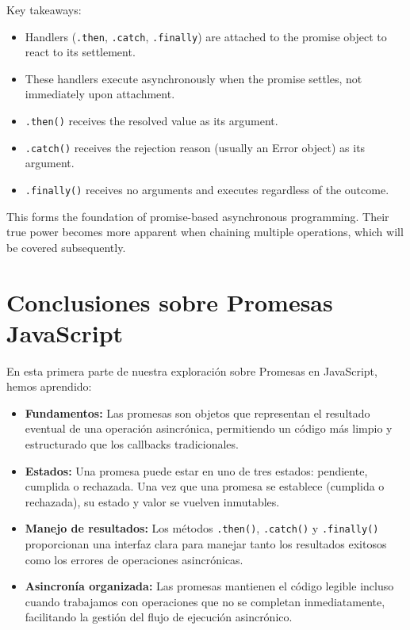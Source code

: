 \documentclass[12pt,letterpaper]{article}
\begin{document}
Key takeaways:
\begin{itemize}
    \item Handlers (\texttt{\textcolor{accentColor}{.then}}, \texttt{\textcolor{accentColor}{.catch}}, \texttt{\textcolor{accentColor}{.finally}}) are attached to the promise object to react to its settlement.
    \item These handlers execute asynchronously when the promise settles, not immediately upon attachment.
    \item \texttt{\textcolor{accentColor}{.then()}} receives the resolved value as its argument.
    \item \texttt{\textcolor{accentColor}{.catch()}} receives the rejection reason (usually an Error object) as its argument.
    \item \texttt{\textcolor{accentColor}{.finally()}} receives no arguments and executes regardless of the outcome.
\end{itemize}

This forms the foundation of promise-based asynchronous programming. Their true power becomes more apparent when chaining multiple operations, which will be covered subsequently.

\section{Conclusiones sobre Promesas JavaScript}

En esta primera parte de nuestra exploración sobre Promesas en JavaScript, hemos aprendido:

\begin{itemize}
    \item \textbf{\textcolor{accentColor}{Fundamentos:}} Las promesas son objetos que representan el resultado eventual de una operación asincrónica, permitiendo un código más limpio y estructurado que los callbacks tradicionales.
    
    \item \textbf{\textcolor{accentColor}{Estados:}} Una promesa puede estar en uno de tres estados: pendiente, cumplida o rechazada. Una vez que una promesa se establece (cumplida o rechazada), su estado y valor se vuelven inmutables.
    
    \item \textbf{\textcolor{accentColor}{Manejo de resultados:}} Los métodos \texttt{\textcolor{accentColor}{.then()}}, \texttt{\textcolor{accentColor}{.catch()}} y \texttt{\textcolor{accentColor}{.finally()}} proporcionan una interfaz clara para manejar tanto los resultados exitosos como los errores de operaciones asincrónicas.
    
    \item \textbf{\textcolor{accentColor}{Asincronía organizada:}} Las promesas mantienen el código legible incluso cuando trabajamos con operaciones que no se completan inmediatamente, facilitando la gestión del flujo de ejecución asincrónico.
\end{itemize}
\end{document}
